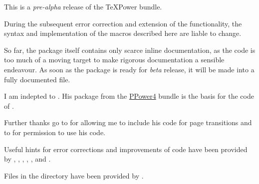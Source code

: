 \begin{slide}
  This is a \emph{pre-alpha} release of the \TeX Power bundle.

  During the subsequent error correction and extension of the functionality, the syntax and implementation of the macros
  described here are liable to change.

  So far, the  package itself contains only scarce inline documentation, as the code is too much of a
  moving target to make rigorous documentation a sensible endeavour. As soon as the  package is ready for
  \emph{beta} release, it will be made into a fully documented  file.

  \newslide

  I am indepted to \href{mailto:guntermann@iti.informatik.tu-darmstadt.de}{}. His package
  \href{http://www-sp.iti.informatik.tu-darmstadt.de/software/ppower4/pp4sty.zip}{} from the  \href{http://www-sp.iti.informatik.tu-darmstadt.de/software/ppower4/}{PPower4} bundle
  is the basis for the code of .

  Further thanks go to \href{mailto:dongen@cs.ucc.ie}{} for allowing me to include his code for
  page transitions and to \href{mailto:Martin.Schroeder@ACM.org}{} for permission to use his
   code.

  Useful hints for error corrections and improvements of code have been provided by ,
  , , , , and .

  Files in the  directory have been provided by .

  \newslide

  \tableofcontents
\end{slide}
